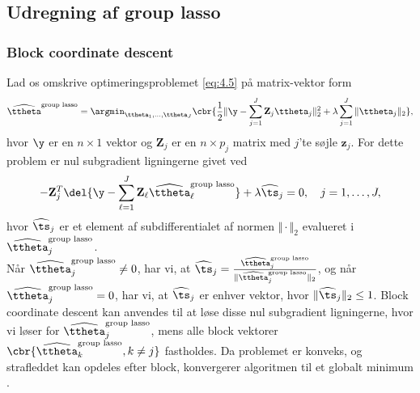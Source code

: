\subsection{Udregning af group lasso}
%
\subsubsection{Block coordinate descent}
Lad os omskrive optimeringsproblemet \eqref{eq:4.5} på matrix-vektor form
\begin{align}
\widehat{\ttheta}^{\text{group lasso}} = \argmin_{\ttheta_1, \ldots, \ttheta_J} \cbr{\frac{1}{2} \Vert \y - \sum_{j=1}^J \mathbf{Z}_{j} \ttheta_j \Vert_2^2 + \lambda \sum_{j=1}^J \Vert \ttheta_j \Vert_2}, \label{eq:4.11}
\end{align}
hvor \(\y\) er en \(n \times 1\) vektor og \(\mathbf{Z}_j\) er en \(n \times p_j\) matrix med \(j\)'te søjle \(\mathbf{z}_j\).
For dette problem er nul subgradient ligningerne givet ved
\begin{align*}
- \mathbf{Z}_{j}^T \del{\y - \sum_{\ell=1}^J \mathbf{Z}_\ell \widehat{\ttheta}^\text{group lasso}_\ell} + \lambda \widehat{\ts}_j = 0, \quad j=1,\ldots, J,
\end{align*} 
hvor $\widehat{\ts}_j $ er et element af subdifferentialet af normen $\Vert \cdot \Vert_2$ evalueret i $\widehat{\ttheta}_j^\text{group lasso}$. \\
Når $\widehat{\ttheta}^\text{group lasso}_j \neq 0$, har vi, at $\widehat{\ts}_j = \frac{\widehat{\ttheta}^\text{group lasso}_j}{\Vert \widehat{\ttheta}^\text{group lasso}_j \Vert_2}$, og når $\widehat{\ttheta}^\text{group lasso}_j=0$, har vi, at $\widehat{\ts}_j$ er enhver vektor, hvor $\Vert \widehat{\ts}_j \Vert_2 \leq 1$.
Block coordinate descent kan anvendes til at løse disse nul subgradient ligningerne, hvor vi løser for $\widehat{\ttheta}^\text{group lasso}_j$, mens alle block vektorer $\cbr{\widehat{\ttheta}^\text{group lasso}_k, k \neq j}$ fastholdes.
Da problemet er konveks, og strafleddet kan opdeles efter block, konvergerer algoritmen til et globalt minimum \citep{Tseng_1993}.

